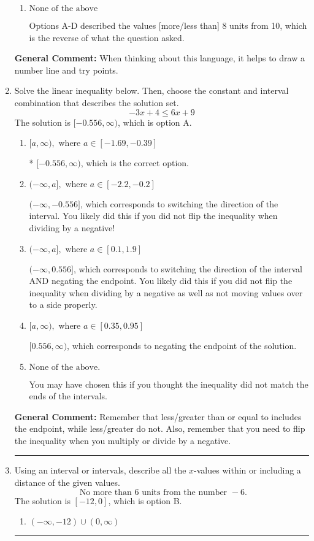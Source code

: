 \documentclass{extbook}[14pt]
\newcommand{\litem}[1]{\item #1

\rule{\textwidth}{0.4pt}}
\begin{document}
\begin{enumerate}
{\begin{enumerate}[label=\Alph*.]
This describes the values more than 8 from 10
\item \( \text{None of the above} \)

Options A-D described the values [more/less than] 8 units from 10, which is the reverse of what the question asked.
\end{enumerate}

\textbf{General Comment:} When thinking about this language, it helps to draw a number line and try points.
}
\litem{
Solve the linear inequality below. Then, choose the constant and interval combination that describes the solution set.
\[ -3x + 4 \leq 6x + 9 \]
The solution is \( [-0.556, \infty) \), which is option A.\begin{enumerate}[label=\Alph*.]
\item \( [a, \infty), \text{ where } a \in [-1.69, -0.39] \)

* $[-0.556, \infty)$, which is the correct option.
\item \( (-\infty, a], \text{ where } a \in [-2.2, -0.2] \)

 $(-\infty, -0.556]$, which corresponds to switching the direction of the interval. You likely did this if you did not flip the inequality when dividing by a negative!
\item \( (-\infty, a], \text{ where } a \in [0.1, 1.9] \)

 $(-\infty, 0.556]$, which corresponds to switching the direction of the interval AND negating the endpoint. You likely did this if you did not flip the inequality when dividing by a negative as well as not moving values over to a side properly.
\item \( [a, \infty), \text{ where } a \in [0.35, 0.95] \)

 $[0.556, \infty)$, which corresponds to negating the endpoint of the solution.
\item \( \text{None of the above}. \)

You may have chosen this if you thought the inequality did not match the ends of the intervals.
\end{enumerate}

\textbf{General Comment:} Remember that less/greater than or equal to includes the endpoint, while less/greater do not. Also, remember that you need to flip the inequality when you multiply or divide by a negative.
}
\litem{
Using an interval or intervals, describe all the $x$-values within or including a distance of the given values.
\[ \text{ No more than } 6 \text{ units from the number } -6. \]
The solution is \( [-12, 0] \), which is option B.\begin{enumerate}[label=\Alph*.]
\item \( (-\infty, -12) \cup (0, \infty) \)


\end{enumerate}}
\end{enumerate}
\end{document}
